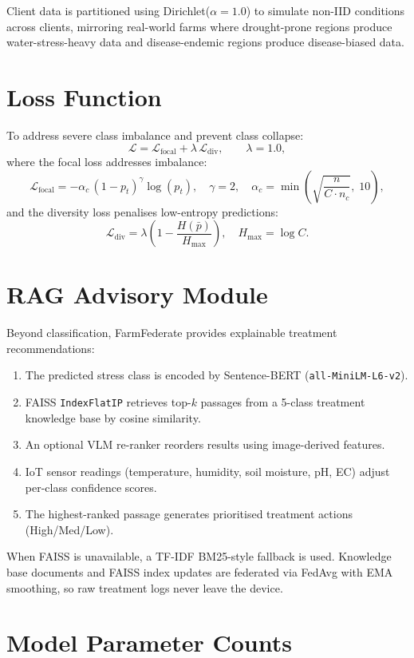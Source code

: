 \documentclass[12pt, a4paper, oneside]{Thesis}
\begin{document}
Client data is partitioned using Dirichlet($\alpha{=}1.0$) \cite{Hsu2019} to simulate non-IID conditions across clients, mirroring real-world farms where drought-prone regions produce water-stress-heavy data and disease-endemic regions produce disease-biased data.

\section{Loss Function}

To address severe class imbalance and prevent class collapse:
\[
\mathcal{L} = \mathcal{L}_{\mathrm{focal}} + \lambda\,\mathcal{L}_{\mathrm{div}},
\qquad \lambda = 1.0,
\]
where the focal loss \cite{Lin2017} addresses imbalance:
\[
\mathcal{L}_{\mathrm{focal}} = -\alpha_c\,(1-p_t)^{\gamma}\log(p_t),
\quad \gamma=2,
\quad \alpha_c = \min\!\left(\sqrt{\frac{n}{C\cdot n_c}},\;10\right),
\]
and the diversity loss penalises low-entropy predictions:
\[
\mathcal{L}_{\mathrm{div}} = \lambda\left(1 - \frac{H(\bar{p})}{H_{\max}}\right),
\quad H_{\max} = \log C.
\]

\section{RAG Advisory Module}

Beyond classification, FarmFederate provides explainable treatment recommendations:
\begin{enumerate}[leftmargin=1.2em]
  \item The predicted stress class is encoded by Sentence-BERT \cite{Reimers2019} (\texttt{all-MiniLM-L6-v2}).
  \item FAISS \cite{Johnson2019} \texttt{IndexFlatIP} retrieves top-$k$ passages from a 5-class treatment knowledge base by cosine similarity.
  \item An optional VLM re-ranker reorders results using image-derived features.
  \item IoT sensor readings (temperature, humidity, soil moisture, pH, EC) adjust per-class confidence scores.
  \item The highest-ranked passage generates prioritised treatment actions (High/Med/Low).
\end{enumerate}
When FAISS is unavailable, a TF-IDF BM25-style fallback \cite{Robertson1994} is used. Knowledge base documents and FAISS index updates are federated via FedAvg with EMA smoothing, so raw treatment logs never leave the device.

\section{Model Parameter Counts}
\end{document}
